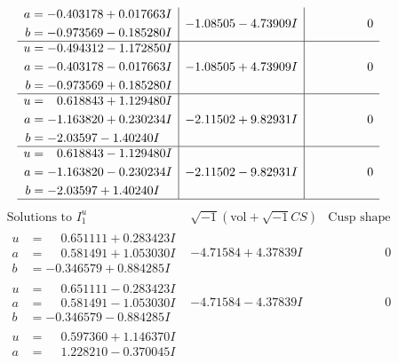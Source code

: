 \documentclass[1p]{elsarticle_modified}
\theoremstyle{definition}
\newcommand{\I}{\sqrt{-1}}
\begin{document}
$$\begin{array}{c|c|c}
\begin{aligned}
a &= -0.403178 + 0.017663 I \\
b &= -0.973569 - 0.185280 I\end{aligned}
 & -1.08505 - 4.73909 I & \phantom{-0.000000 } 0 \\ \hline\begin{aligned}
u &= -0.494312 - 1.172850 I \\
a &= -0.403178 - 0.017663 I \\
b &= -0.973569 + 0.185280 I\end{aligned}
 & -1.08505 + 4.73909 I & \phantom{-0.000000 } 0 \\ \hline\begin{aligned}
u &= \phantom{-}0.618843 + 1.129480 I \\
a &= -1.163820 + 0.230234 I \\
b &= -2.03597 - 1.40240 I\end{aligned}
 & -2.11502 + 9.82931 I & \phantom{-0.000000 } 0 \\ \hline\begin{aligned}
u &= \phantom{-}0.618843 - 1.129480 I \\
a &= -1.163820 - 0.230234 I \\
b &= -2.03597 + 1.40240 I\end{aligned}
 & -2.11502 - 9.82931 I & \phantom{-0.000000 } 0\\
 \hline 
 \end{array}$$\newpage$$\begin{array}{c|c|c}  
\text{Solutions to }I^u_{1}& \I (\text{vol} + \sqrt{-1}CS) & \text{Cusp shape}\\
 \hline 
\begin{aligned}
u &= \phantom{-}0.651111 + 0.283423 I \\
a &= \phantom{-}0.581491 + 1.053030 I \\
b &= -0.346579 + 0.884285 I\end{aligned}
 & -4.71584 + 4.37839 I & \phantom{-0.000000 } 0 \\ \hline\begin{aligned}
u &= \phantom{-}0.651111 - 0.283423 I \\
a &= \phantom{-}0.581491 - 1.053030 I \\
b &= -0.346579 - 0.884285 I\end{aligned}
 & -4.71584 - 4.37839 I & \phantom{-0.000000 } 0 \\ \hline\begin{aligned}
u &= \phantom{-}0.597360 + 1.146370 I \\
a &= \phantom{-}1.228210 - 0.370045 I \\

\end{aligned}
\end{array}$$
\end{document}
